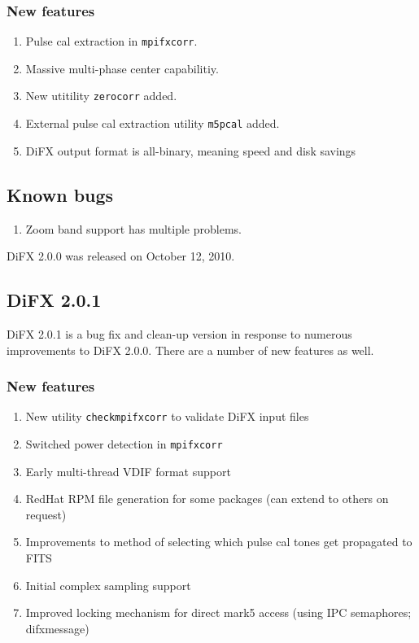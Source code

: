 \subsubsection{New features}

\begin{enumerate}
\item Pulse cal extraction in {\tt mpifxcorr}.
\item Massive multi-phase center capabilitiy.
\item New utitility {\tt zerocorr} added.
\item External pulse cal extraction utility {\tt m5pcal} added.
\item DiFX output format is all-binary, meaning speed and disk savings
\end{enumerate}

\subsection{Known bugs}

\begin{enumerate}
\item Zoom band support has multiple problems.
\end{enumerate}

DiFX 2.0.0 was released on October 12, 2010.

\subsection{DiFX 2.0.1}

DiFX 2.0.1 is a bug fix and clean-up version in response to numerous improvements to DiFX 2.0.0.
There are a number of new features as well.

\subsubsection{New features}

\begin{enumerate}
\item New utility {\tt checkmpifxcorr} to validate DiFX input files
\item Switched power detection in {\tt mpifxcorr}
\item Early multi-thread VDIF format support
\item RedHat RPM file generation for some packages (can extend to others on request)
\item Improvements to method of selecting which pulse cal tones get propagated to FITS
\item Initial complex sampling support
\item Improved locking mechanism for direct mark5 access (using IPC semaphores; difxmessage)
\end{enumerate}


